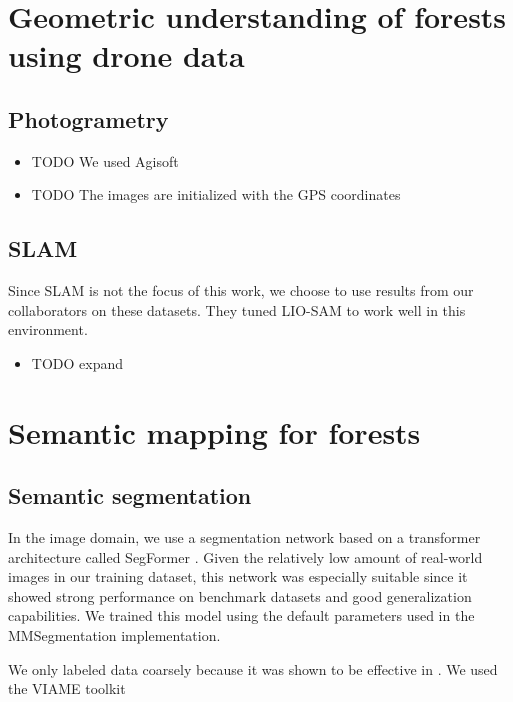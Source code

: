 \section{Geometric understanding of forests using drone data}
\subsection{Photogrametry}
\begin{itemize}
    \item TODO We used Agisoft  
    \item TODO The images are initialized with the GPS coordinates
\end{itemize}

\subsection{SLAM}    
Since SLAM is not the focus of this work, we choose to use results from our collaborators on these datasets. They tuned LIO-SAM\cite{Shan2020LIO-SAM:Mapping} to work well in this environment.
\begin{itemize}
    \item TODO expand 
\end{itemize}


\section{Semantic mapping for forests}
\subsection{Semantic segmentation}
In the image domain, we use a segmentation network based on a transformer architecture called SegFormer \cite{Xie2021}. Given the relatively low amount of real-world images in our training dataset, this network was especially suitable since it showed strong performance on benchmark datasets and good generalization capabilities. We trained this model using the default parameters used in the MMSegmentation \cite{MMSegmentation} implementation. 

We only labeled data coarsely because it was shown to be effective in \cite{Davila2022ADAPT:AI}. We used the VIAME toolkit 
    
